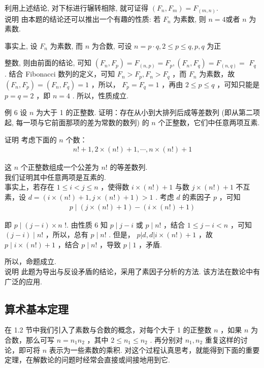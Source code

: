 利用上述结论, 对下标进行辗转相除, 就可证得 $\left(F_{n}, F_{m}\right)=F_{(m, n)}$.\\
说明 由本题的结论还可以推出一个有趣的性质: 若 $F_{n}$ 为素数, 则 $n=4$或者 $n$ 为素数. 

事实上, 设 $F_{n}$ 为素数, 而 $n$ 为合数, 可设 $n=p \cdot q, 2 \leqslant p \leqslant q, p ,  q$ 为正

整数, 则由前面的结论, 可知 $\left(F_{n}, F_{p}\right)=F_{(n, p)}=F_{p},\left(F_{n}, F_{q}\right)=F_{(n, q)}=$ $F_{q}$ . 结合 Fibonacci 数列的定义，可知 $F_{n}>F_{p}, F_{n}>F_{q}$ ，而 $F_{n}$ 为素数，故 $\left(F_{n}, F_{p}\right)=\left(F_{n}, F_{q}\right)=1$ ，所以， $F_{p}=F_{q}=1$ ，再由 $2 \leqslant p \leqslant q$ ，可知只能是 $p=q=2$ ，即 $n=4$ . 所以，性质成立. 

例 6 设 $n$ 为大于 1 的正整数. 证明：存在从小到大排列后成等差数列 (即从第二项起, 每一项与它前面那项的差为常数的数列) 的 $n$ 个正整数，它们中任意两项互素. 

证明 考虑下面的 $n$ 个数：\\
\begin{align*}
n!+1,2 \times(n!)+1, \cdots, n \times(n!)+1
\end{align*}

这 $n$ 个正整数组成一个公差为 $n!$ 的等差数列.\\
我们证明其中任意两项是互素的. \\
事实上，若存在 $1 \leqslant i<j \leqslant n$ ，使得数 $i \times(n!)+1$ 与数 $j \times(n!)+1$ 不互素，设 $d=(i \times(n!)+1, j \times(n!)+1)>1$ . 考虑 $d$ 的素因子 $p$ ，可知\\
\begin{align*}
p \mid(j \times(n!)+1)-(i \times(n!)+1)
\end{align*}

即 $p \mid(j-i) \times n$ !. 由性质 6 知 $p \mid j-i$ 或 $p \mid n!$ ，结合 $1 \leqslant j-i<n$ ，可知 $(j-i) \mid n!$ ，所以，总有 $p \mid n!$ . 但是， $p|d, d| i \times(n!)+1$ ，故 $p \mid i \times(n!)+1$ ，结合 $p \mid n!$ ，导致 $p \mid 1$ ，矛盾. 

所以，命题成立. \\
说明 此题为导出与反设矛盾的结论，采用了素因子分析的方法. 该方法在数论中有广泛的应用. 

\subsection{算术基本定理}
在 1.2 节中我们引入了素数与合数的概念，对每个大于 1 的正整数 $n$ ，如果 $n$ 为合数，那么可写 $n=n_{1} n_{2}$ ，其中 $2 \leqslant n_{1} \leqslant n_{2}$ . 再分别对 $n_{1} ,  n_{2}$ 重复这样的讨论，即可将 $n$ 表示为一些素数的乘积. 对这个过程认真思考，就能得到下面的重要定理，在解数论的问题时经常会直接或间接地用到它. 


